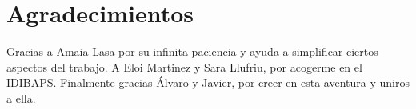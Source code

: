 \documentclass[fleqn,12pt]{UICArticle} %
\begin{document}
\section*{Agradecimientos}
Gracias a Amaia Lasa por su infinita paciencia y ayuda a simplificar ciertos aspectos del trabajo. A Eloi Martinez y Sara Llufriu, por acogerme en el IDIBAPS. Finalmente gracias Álvaro y Javier, por creer en esta aventura y uniros a ella.

\endgroup






\end{document}
